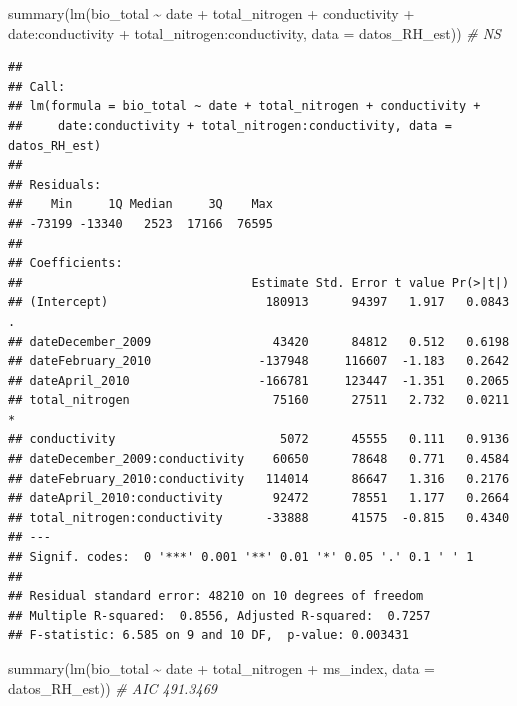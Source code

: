 \documentclass[
]{book}
\newenvironment{Shaded}{\begin{snugshade}}{\end{snugshade}}
\newcommand{\AttributeTok}[1]{\textcolor[rgb]{0.77,0.63,0.00}{#1}}
\newcommand{\CommentTok}[1]{\textcolor[rgb]{0.56,0.35,0.01}{\textit{#1}}}
\newcommand{\FunctionTok}[1]{\textcolor[rgb]{0.00,0.00,0.00}{#1}}
\newcommand{\NormalTok}[1]{#1}
\newcommand{\SpecialCharTok}[1]{\textcolor[rgb]{0.00,0.00,0.00}{#1}}
\begin{document}
\begin{Shaded}
\begin{Highlighting}[]
\FunctionTok{summary}\NormalTok{(}\FunctionTok{lm}\NormalTok{(bio\_total }\SpecialCharTok{\textasciitilde{}}\NormalTok{ date }\SpecialCharTok{+}\NormalTok{ total\_nitrogen }\SpecialCharTok{+}\NormalTok{ conductivity }\SpecialCharTok{+}\NormalTok{ date}\SpecialCharTok{:}\NormalTok{conductivity }\SpecialCharTok{+}\NormalTok{ total\_nitrogen}\SpecialCharTok{:}\NormalTok{conductivity, }\AttributeTok{data =}\NormalTok{ datos\_RH\_est))  }\CommentTok{\# NS}
\end{Highlighting}
\end{Shaded}

\begin{verbatim}
## 
## Call:
## lm(formula = bio_total ~ date + total_nitrogen + conductivity + 
##     date:conductivity + total_nitrogen:conductivity, data = datos_RH_est)
## 
## Residuals:
##    Min     1Q Median     3Q    Max 
## -73199 -13340   2523  17166  76595 
## 
## Coefficients:
##                                Estimate Std. Error t value Pr(>|t|)  
## (Intercept)                      180913      94397   1.917   0.0843 .
## dateDecember_2009                 43420      84812   0.512   0.6198  
## dateFebruary_2010               -137948     116607  -1.183   0.2642  
## dateApril_2010                  -166781     123447  -1.351   0.2065  
## total_nitrogen                    75160      27511   2.732   0.0211 *
## conductivity                       5072      45555   0.111   0.9136  
## dateDecember_2009:conductivity    60650      78648   0.771   0.4584  
## dateFebruary_2010:conductivity   114014      86647   1.316   0.2176  
## dateApril_2010:conductivity       92472      78551   1.177   0.2664  
## total_nitrogen:conductivity      -33888      41575  -0.815   0.4340  
## ---
## Signif. codes:  0 '***' 0.001 '**' 0.01 '*' 0.05 '.' 0.1 ' ' 1
## 
## Residual standard error: 48210 on 10 degrees of freedom
## Multiple R-squared:  0.8556, Adjusted R-squared:  0.7257 
## F-statistic: 6.585 on 9 and 10 DF,  p-value: 0.003431
\end{verbatim}

\begin{Shaded}
\begin{Highlighting}[]
\FunctionTok{summary}\NormalTok{(}\FunctionTok{lm}\NormalTok{(bio\_total }\SpecialCharTok{\textasciitilde{}}\NormalTok{ date }\SpecialCharTok{+}\NormalTok{ total\_nitrogen }\SpecialCharTok{+}\NormalTok{ ms\_index, }\AttributeTok{data =}\NormalTok{ datos\_RH\_est)) }\CommentTok{\# AIC 491.3469}
\end{Highlighting}
\end{Shaded}
\end{document}
